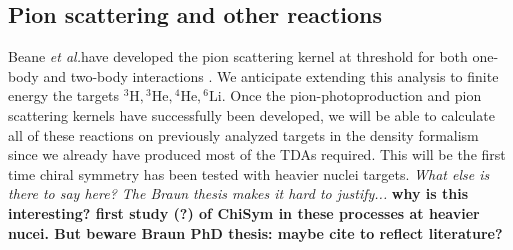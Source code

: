 \documentclass[a4paper,11pt]{article}
\newcommand{\etal}{\textit{et al.}}
\newcommand{\LiS}{{}^{6} \mathrm{Li} }
\newcommand{\HeF}{{}^{4} \mathrm{He}}
\newcommand{\HeT}{{}^{3} \mathrm{He}}
\newcommand{\HThree}{{}^{3} \mathrm{H}}
\newcommand{\ques}[1]{\color{red}\textit{ #1 }\color{black}}
\newcommand{\com}[1]{\color{blue}\small\textbf{ #1 }\color{black}\normalsize}
\begin{document}
\subsection{Pion scattering and other reactions}
Beane \etal have developed the pion scattering kernel at threshold for both
one-body and two-body interactions \cite{Beane2003}.
We anticipate extending this analysis to finite energy the targets $\HThree, \HeT, \HeF, \LiS$.
Once the pion-photoproduction and pion scattering kernels have
successfully been developed, we will be able to calculate all of
these reactions on previously analyzed targets in the density
formalism since we already have produced most of the TDAs required.
This will be the first time chiral symmetry has been tested with heavier nuclei targets.
\ques{What else is there to say here? The Braun thesis makes it hard to justify...}
\com{why is this interesting? first study (?) of ChiSym in these processes at heavier nucei. But beware Braun PhD thesis: maybe cite to reflect literature?}

\end{document}
